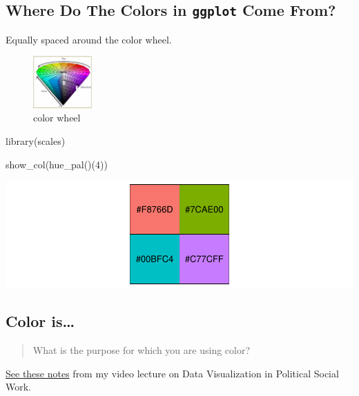 \documentclass[
]{article}
\newenvironment{Shaded}{}{}
\newcommand{\DecValTok}[1]{#1}
\newcommand{\KeywordTok}[1]{\textcolor[rgb]{0.00,0.00,1.00}{#1}}
\newcommand{\NormalTok}[1]{#1}
\begin{document}
\newpage

\hypertarget{where-do-the-colors-in-ggplot-come-from}{%
\subsection{\texorpdfstring{Where Do The Colors in \texttt{ggplot} Come
From?}{Where Do The Colors in ggplot Come From?}}\label{where-do-the-colors-in-ggplot-come-from}}

Equally spaced around the color wheel.

\begin{figure}
\centering
\includegraphics[width=0.2\textwidth,height=\textheight]{colorwheel.png}
\caption{color wheel}
\end{figure}

\begin{Shaded}
\begin{Highlighting}[]
\KeywordTok{library}\NormalTok{(scales)}

\KeywordTok{show_col}\NormalTok{(}\KeywordTok{hue_pal}\NormalTok{()(}\DecValTok{4}\NormalTok{))}
\end{Highlighting}
\end{Shaded}

\includegraphics{design_files/figure-latex/unnamed-chunk-8-1.pdf}

\hypertarget{color-is}{%
\subsection{Color is\ldots{}}\label{color-is}}

\begin{quote}
What is the purpose for which you are using color?
\end{quote}

\href{../political-social-work/index.html\#/color-scroll-down}{See these
notes} from my video lecture on Data Visualization in Political Social
Work.
\end{document}
